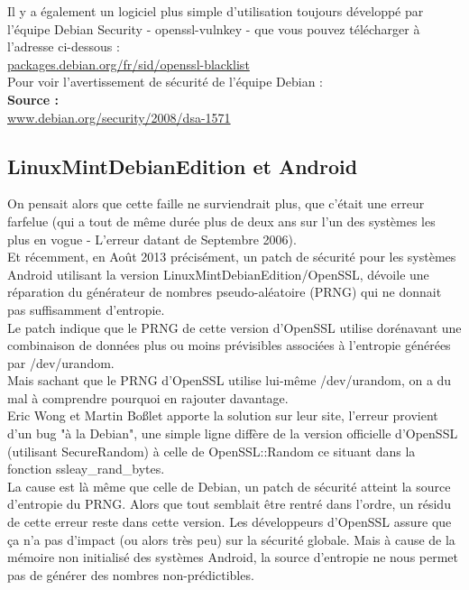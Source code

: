 \documentclass{article}
\begin{document}
	Il y a également un logiciel plus simple d'utilisation toujours développé 
	par l'équipe Debian Security - openssl-vulnkey - que vous pouvez 
	télécharger à l'adresse ci-dessous :\\
	\href{http://packages.debian.org/fr/sid/openssl-blacklist}
	{packages.debian.org/fr/sid/openssl-blacklist}\\
	
	Pour voir l'avertissement de sécurité de l'équipe Debian : \\
	
	\textbf{Source :} \\
	\href{https://www.debian.org/security/2008/dsa-1571}
	{www.debian.org/security/2008/dsa-1571}

	\subsection{LinuxMintDebianEdition et Android}

	On pensait alors que cette faille ne surviendrait plus, que c'était une 
	erreur farfelue (qui a tout de même durée plus de deux ans sur l'un des 
	systèmes les plus en vogue - L'erreur datant de Septembre 2006). \\
	
	Et récemment, en Août 2013 précisément, un patch de sécurité pour les 
	systèmes Android utilisant la version LinuxMintDebianEdition/OpenSSL, 
	dévoile une réparation du générateur de nombres pseudo-aléatoire (PRNG) 
	qui ne donnait pas suffisamment d'entropie. \\
	
	Le patch indique que le PRNG de cette version d'OpenSSL utilise dorénavant 
	une combinaison de données plus ou moins prévisibles associées à 
	l'entropie générées par /dev/urandom. \\
	Mais sachant que le PRNG d'OpenSSL utilise lui-même /dev/urandom, on a du 
	mal à comprendre pourquoi en rajouter davantage.\\

	Eric Wong et Martin Boßlet apporte la solution sur leur site, l'erreur 
	provient d'un bug "à la Debian", une simple ligne diffère de la version 
	officielle d'OpenSSL (utilisant SecureRandom) à celle de OpenSSL::Random 
	ce situant dans la fonction ssleay\_rand\_bytes. \\

	La cause est là même que celle de Debian, un patch de sécurité atteint la 
	source d'entropie du PRNG. Alors que tout semblait être rentré dans 
	l'ordre, un résidu de cette erreur reste dans cette version. Les 
	développeurs d'OpenSSL assure que ça n'a pas d'impact (ou alors très peu) 
	sur la sécurité globale. 
	Mais à cause de la mémoire non initialisé des systèmes Android, la source 
	d'entropie ne nous permet pas de générer des nombres non-prédictibles. \\
\end{document}
